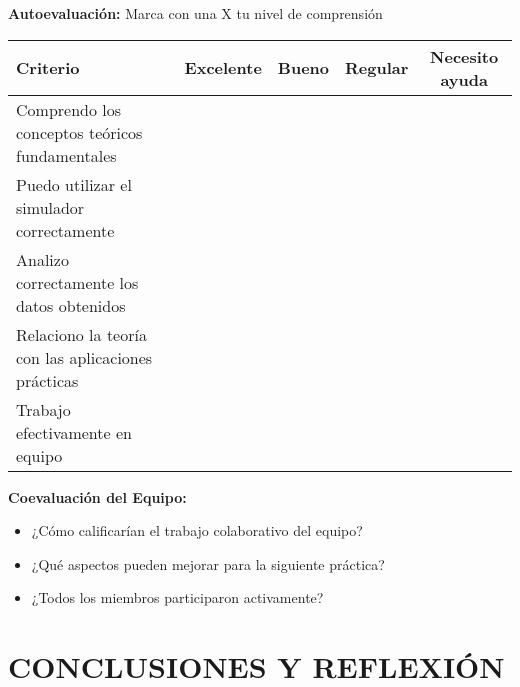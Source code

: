 \documentclass[12pt,a4paper]{article}
\begin{document}
	\begin{evaluacionbox}
		\textbf{Autoevaluación:} Marca con una X tu nivel de comprensión
		
		\begin{center}
			\begin{tabular}{|p{6cm}|c|c|c|c|}
				\hline
				\textbf{Criterio} & \textbf{Excelente} & \textbf{Bueno} & \textbf{Regular} & \textbf{Necesito ayuda} \\
				\hline
				Comprendo los conceptos teóricos fundamentales & & & & \\
				\hline
				Puedo utilizar el simulador correctamente & & & & \\
				\hline
				Analizo correctamente los datos obtenidos & & & & \\
				\hline
				Relaciono la teoría con las aplicaciones prácticas & & & & \\
				\hline
				Trabajo efectivamente en equipo & & & & \\
				\hline
			\end{tabular}
		\end{center}
		
		\textbf{Coevaluación del Equipo:}
		\begin{itemize}
			\item ¿Cómo calificarían el trabajo colaborativo del equipo? \hrulefill
			\item ¿Qué aspectos pueden mejorar para la siguiente práctica? \hrulefill
			\item ¿Todos los miembros participaron activamente? \hrulefill
		\end{itemize}
	\end{evaluacionbox}
	
	
	\section{CONCLUSIONES Y REFLEXIÓN}
	
\end{document}

